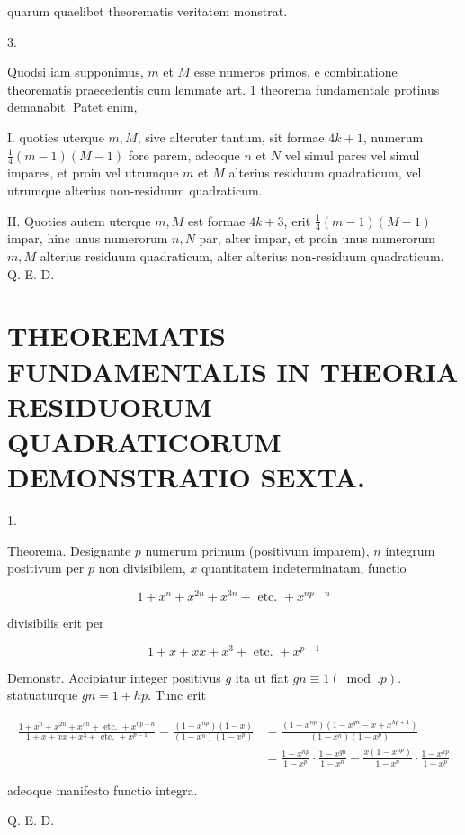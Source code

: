 \documentclass[10pt]{article}
\begin{document}
quarum quaelibet theorematis veritatem monstrat.

3.

Quodsi iam supponimus, \(m\) et \(M\) esse numeros primos, e combinatione theorematis praecedentis cum lemmate art. 1 theorema fundamentale protinus demanabit. Patet enim,

I. quoties uterque \(m, M\), sive alteruter tantum, sit formae \(4 k+1\), numerum \(\frac{1}{4}(m-1)(M-1)\) fore parem, adeoque \(n\) et \(N\) vel simul pares vel simul impares, et proin vel utrumque \(m\) et \(M\) alterius residuum quadraticum, vel utrumque alterius non-residuum quadraticum.

II. Quoties autem uterque \(m, M\) est formae \(4 k+3\), erit \(\frac{1}{4}(m-1)(M-1)\) impar, hinc unus numerorum \(n, N\) par, alter impar, et proin unus numerorum \(m, M\) alterius residuum quadraticum, alter alterius non-residuum quadraticum. Q. E. D.

\section*{THEOREMATIS FUNDAMENTALIS IN THEORIA RESIDUORUM QUADRATICORUM DEMONSTRATIO SEXTA.}
1.

Theorema. Designante \(p\) numerum primum (positivum imparem), \(n\) integrum positivum per \(p\) non divisibilem, \(x\) quantitatem indeterminatam, functio

\[
1+x^{n}+x^{2 n}+x^{3 n}+\text { etc. }+x^{n p-n}
\]

divisibilis erit per

\[
1+x+x x+x^{3}+\text { etc. }+x^{p-1}
\]

Demonstr. Accipiatur integer positivus \(g\) ita ut fiat \(g n \equiv 1(\bmod . p)\). statuaturque \(g n=1+h p\). Tunc erit

\[
\begin{aligned}
\frac{1+x^{n}+x^{2 n}+x^{3 n}+\text { etc. }+x^{n p-n}}{1+x+x x+x^{3}+\text { etc. }+x^{p-1}}=\frac{\left(1-x^{n p}\right)(1-x)}{\left(1-x^{n}\right)\left(1-x^{p}\right)} & =\frac{\left(1-x^{n p}\right)\left(1-x^{g n}-x+x^{h p+1}\right)}{\left(1-x^{n}\right)\left(1-x^{p}\right)} \\
& =\frac{1-x^{n p}}{1-x^{p}} \cdot \frac{1-x^{g n}}{1-x^{n}}-\frac{x\left(1-x^{n p}\right)}{1-x^{n}} \cdot \frac{1-x^{h p}}{1-x^{p}}
\end{aligned}
\]

adeoque manifesto functio integra.

Q. E. D.
\end{document}
